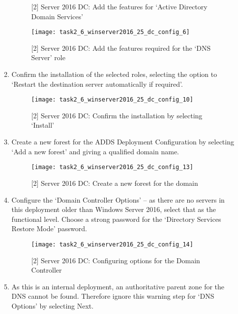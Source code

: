 \begin{enumerate}[series=task2methodology3]
\begin{enumerate}[label=(\alph*)]
\begin{figure}[H]
          \caption{[2] Server 2016 DC: Add the features for `Active Directory Domain Services'}
          \label{fig:task2:vspherec_windc2_c5}
        \end{figure}
        \begin{figure}[H]
          \centering
          \captionsetup{skip=2pt}
          \texttt{[image: task2\_6\_winserver2016\_25\_dc\_config\_6]}
          \caption{[2] Server 2016 DC: Add the features required for the `DNS Server' role}
          \label{fig:task2:vspherec_windc2_c6}
        \end{figure}
      \item Confirm the installation of the selected roles, selecting the option to `Restart the destination server automatically if required'.
        \begin{figure}[H]
          \centering
          \captionsetup{skip=2pt}
          \texttt{[image: task2\_6\_winserver2016\_25\_dc\_config\_10]}
          \caption{[2] Server 2016 DC: Confirm the installation by selecting `Install'}
          \label{fig:task2:vspherec_windc2_c10}
        \end{figure}
      \item Create a new forest for the ADDS Deployment Configuration by selecting `Add a new forest' and giving a qualified domain name.
        \begin{figure}[H]
          \centering
          \captionsetup{skip=2pt}
          \texttt{[image: task2\_6\_winserver2016\_25\_dc\_config\_13]}
          \caption{[2] Server 2016 DC: Create a new forest for the domain}
          \label{fig:task2:vspherec_windc2_c13}
        \end{figure}
      \item Configure the `Domain Controller Options' -- as there are no servers in this deployment older than Windows Server 2016, select that as the functional level. Choose a strong password for the `Directory Services Restore Mode' password.
        \begin{figure}[H]
          \centering
          \captionsetup{skip=2pt}
          \texttt{[image: task2\_6\_winserver2016\_25\_dc\_config\_14]}
          \caption{[2] Server 2016 DC: Configuring options for the Domain Controller}
          \label{fig:task2:vspherec_windc2_c14}
        \end{figure}
      \item As this is an internal deployment, an authoritative parent zone for the DNS cannot be found. Therefore ignore this warning step for `DNS Options' by selecting Next.

\end{enumerate}
\end{enumerate}
